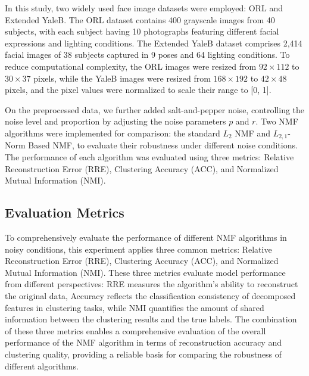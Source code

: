 In this study, two widely used face image datasets were employed: ORL and Extended YaleB. The ORL dataset contains 400 grayscale images from 40 subjects, with each subject having 10 photographs featuring different facial expressions and lighting conditions. The Extended YaleB dataset comprises 2,414 facial images of 38 subjects captured in 9 poses and 64 lighting conditions. To reduce computational complexity, the ORL images were resized from $92 \times 112$ to $30 \times 37$ pixels, while the YaleB images were resized from $168 \times 192$ to $42 \times 48$ pixels, and the pixel values were normalized to scale their range to [0, 1].

On the preprocessed data, we further added salt-and-pepper noise, controlling the noise level and proportion by adjusting the noise parameters $p$ and $r$. Two NMF algorithms were implemented for comparison: the standard $L_2$ NMF and $L_{2,1}$-Norm Based NMF, to evaluate their robustness under different noise conditions. The performance of each algorithm was evaluated using three metrics: Relative Reconstruction Error (RRE), Clustering Accuracy (ACC), and Normalized Mutual Information (NMI).


\subsection{Evaluation Metrics}
To comprehensively evaluate the performance of different NMF algorithms in noisy conditions, this experiment applies three common metrics: Relative Reconstruction Error (RRE), Clustering Accuracy (ACC), and Normalized Mutual Information (NMI). These three metrics evaluate model performance from different perspectives: RRE measures the algorithm's ability to reconstruct the original data, Accuracy reflects the classification consistency of decomposed features in clustering tasks, while NMI quantifies the amount of shared information between the clustering results and the true labels. The combination of these three metrics enables a comprehensive evaluation of the overall performance of the NMF algorithm in terms of reconstruction accuracy and clustering quality, providing a reliable basis for comparing the robustness of different algorithms\cite{sohrabi2025graph}\cite{hedjam2021nmf}.

